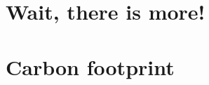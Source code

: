 \chapter{Wait, there is more!}
\label{chapter:blabla1}

\lipsum[1-5]

\lipsum[11-12]
\chapter{Carbon footprint}
\label{chapter:blabla2}

\lipsum[11-12]

